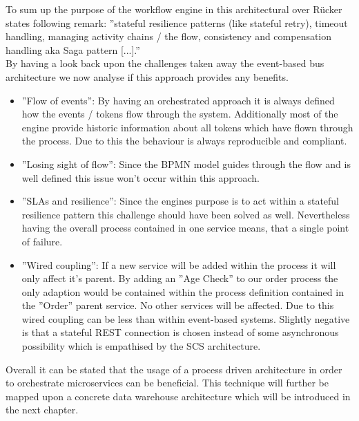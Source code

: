 To sum up the purpose of the workflow engine in this architectural over Rücker states following remark: ''stateful resilience patterns (like stateful retry), timeout handling, managing activity chains / the flow, consistency and compensation handling aka Saga pattern [...].'' \cite{orchestrationMicroServices}\newline
\\
By having a look back upon the challenges taken away the event-based bus architecture we now analyse if this approach provides any benefits. 
\begin{itemize}
    \item ''Flow of events'': By having an orchestrated approach it is always defined how the events / tokens flow through the system. Additionally most of the engine provide historic information about all tokens which have flown through the process. Due to this the behaviour is always reproducible and compliant. 
    \item ''Losing sight of flow'': Since the BPMN model guides through the flow and is well defined this issue won't occur within this approach.
    \item ''SLAs and resilience'': Since the engines purpose is to act within a stateful resilience pattern this challenge should have been solved as well. Nevertheless having the overall process contained in one service means, that a single point of failure. 
    \item ''Wired coupling'': If a new service will be added within the process it will only affect it's parent. By adding an ''Age Check'' to our order process the only adaption would be contained within the process definition contained in the ''Order'' parent service. No other services will be affected. Due to this wired coupling can be less than within event-based systems. Slightly negative is that a stateful REST connection is chosen instead of some asynchronous possibility which is empathised by the SCS architecture. 
\end{itemize}
Overall it can be stated that the usage of a process driven architecture in order to orchestrate microservices can be beneficial. This technique will further be mapped upon a concrete data warehouse architecture which will be introduced in the next chapter. 
